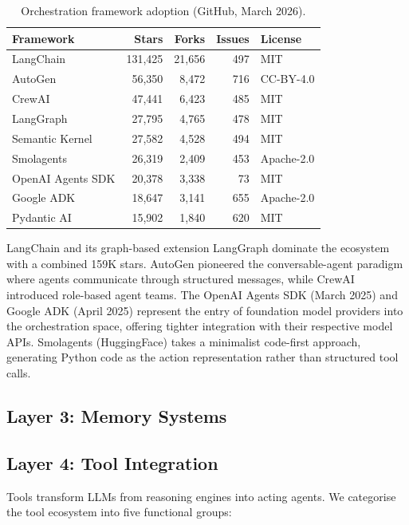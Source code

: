 \documentclass[12pt, a4paper]{article}
\begin{document}
\begin{table}[ht]
\centering
\caption{Orchestration framework adoption (GitHub, March 2026).}
\label{tab:frameworks}
\begin{tabular}{lrrrl}
\toprule
\textbf{Framework} & \textbf{Stars} & \textbf{Forks} & \textbf{Issues} & \textbf{License} \\
\midrule
LangChain        & 131,425 & 21,656 & 497  & MIT \\
AutoGen          & 56,350  & 8,472  & 716  & CC-BY-4.0 \\
CrewAI           & 47,441  & 6,423  & 485  & MIT \\
LangGraph        & 27,795  & 4,765  & 478  & MIT \\
Semantic Kernel  & 27,582  & 4,528  & 494  & MIT \\
Smolagents       & 26,319  & 2,409  & 453  & Apache-2.0 \\
OpenAI Agents SDK& 20,378  & 3,338  & 73   & MIT \\
Google ADK       & 18,647  & 3,141  & 655  & Apache-2.0 \\
Pydantic AI      & 15,902  & 1,840  & 620  & MIT \\
\bottomrule
\end{tabular}
\end{table}

LangChain and its graph-based extension LangGraph dominate the ecosystem with a combined 159K stars. AutoGen pioneered the conversable-agent paradigm where agents communicate through structured messages, while CrewAI introduced role-based agent teams. The OpenAI Agents SDK (March 2025) and Google ADK (April 2025) represent the entry of foundation model providers into the orchestration space, offering tighter integration with their respective model APIs. Smolagents (HuggingFace) takes a minimalist code-first approach, generating Python code as the action representation rather than structured tool calls.

\subsection{Layer 3: Memory Systems}

\subsection{Layer 4: Tool Integration}
Tools transform LLMs from reasoning engines into acting agents. We categorise the tool ecosystem into five functional groups:
\end{document}
